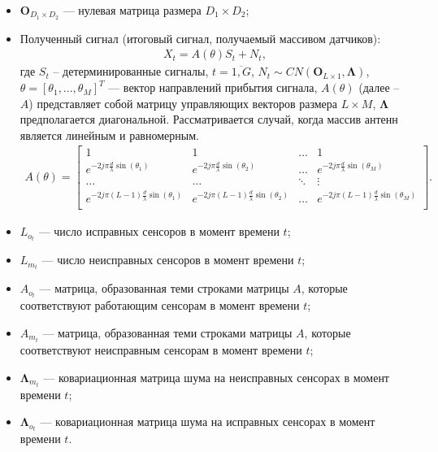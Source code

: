 \documentclass[11pt]{article}
\begin{document}
\begin{itemize}
\item
$\mathbf{O}_{D_1 \times D_2}$ --- нулевая матрица размера $D_1 \times D_2$;
\item
Полученный сигнал (итоговый сигнал, получаемый массивом датчиков):
\begin{equation}
\begin{gathered}
X_t=A(\theta)S_t+N_t,
\end{gathered}
\end{equation}
где $S_t$  -- детерминированные сигналы, $t=\overline{1,G}$, $N_t \sim CN(\mathbf{O}_{L \times 1}, \mathbf{\Lambda})$,  $\theta=[\theta_1,...,\theta_M]^T$ --- вектор направлений прибытия сигнала, $A(\theta)$ (далее -- $A$) представляет собой матрицу управляющих векторов размера $L \times M$, $\mathbf{\Lambda}$ предполагается диагональной. Рассматривается случай, когда массив антенн является линейным и равномерным.
\begin{gather}
A(\theta) = \begin{bmatrix}
1&1&\dots&1\\
e^{-2j\pi \frac{d}{\lambda}\sin(\theta_1)}& e^{-2j\pi \frac{d}{\lambda}\sin(\theta_2)}&\dots&e^{-2j\pi \frac{d}{\lambda}\sin(\theta_M)}\\
\dots&\dots&\ddots&\vdots\\
e^{-2j\pi (L-1) \frac{d}{\lambda}\sin(\theta_1)}& e^{-2j\pi (L-1) \frac{d}{\lambda}\sin(\theta_2)}&\dots&e^{-2j\pi (L-1) \frac{d}{\lambda}\sin(\theta_M)}\\
\end{bmatrix}.
\nonumber
\end{gather}
\end{itemize}
\begin{itemize}
\item
$L_{o_t}$ --- число исправных сенсоров в момент времени $t$;
\item
 $L_{m_t}$ --- число неисправных сенсоров в момент времени $t$;
\item 
$A_{o_t}$ --- матрица, образованная теми строками матрицы $A$, которые соответствуют работающим сенсорам в момент времени $t$; 
\item
$A_{m_t}$ --- матрица, образованная теми строками матрицы $A$, которые соответствуют неисправным сенсорам в момент времени $t$;
\item
$\mathbf{\Lambda}_{m_t}$ --- ковариационная матрица шума на неисправных сенсорах в момент времени $t$;
\item 
 $\mathbf{\Lambda}_{o_t}$ --- ковариационная матрица шума на исправных сенсорах в момент времени $t$.
\end{itemize}
\end{document}
